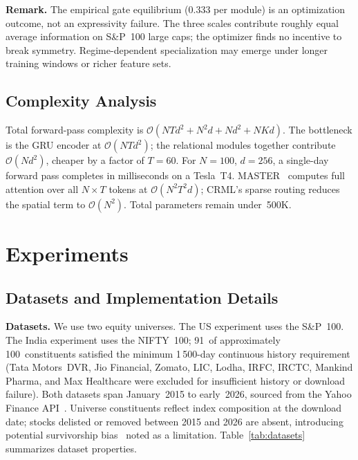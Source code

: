 \documentclass[journal]{IEEEtran}
\begin{document}
\smallskip
\noindent\textbf{Remark.} The empirical gate equilibrium (0.333 per
module) is an optimization outcome, not an expressivity failure. The
three scales contribute roughly equal average information on S\&P~100
large caps; the optimizer finds no incentive to break symmetry.
Regime-dependent specialization may emerge under longer training windows
or richer feature sets.

\subsection{Complexity Analysis}

Total forward-pass complexity is $\mathcal{O}(NTd^2+N^2d+Nd^2+NKd)$.
The bottleneck is the GRU encoder at $\mathcal{O}(NTd^2)$; the
relational modules together contribute $\mathcal{O}(Nd^2)$, cheaper by
a factor of $T=60$. For $N=100$, $d=256$, a single-day forward pass
completes in milliseconds on a Tesla~T4.
MASTER~\cite{li2024master} computes full attention over all
$N\!\times\!T$ tokens at $\mathcal{O}(N^2T^2d)$; CRML's sparse routing
reduces the spatial term to $\mathcal{O}(N^2)$. Total parameters remain
under~500K.



\section{Experiments}

\subsection{Datasets and Implementation Details}

\textbf{Datasets.} We use two equity universes. The US experiment uses
the S\&P~100. The India experiment uses the NIFTY~100; 91~of
approximately 100~constituents satisfied the minimum 1\,500-day
continuous history requirement (Tata Motors~DVR, Jio Financial, Zomato,
LIC, Lodha, IRFC, IRCTC, Mankind Pharma, and Max Healthcare were
excluded for insufficient history or download failure). Both datasets
span January~2015 to early~2026, sourced from the Yahoo Finance
API~\cite{yang2020qlib}. Universe constituents reflect index composition
at the download date; stocks delisted or removed between 2015 and 2026
are absent, introducing potential survivorship
bias~\cite{brown1992survivorship} noted as a limitation.
Table~\ref{tab:datasets} summarizes dataset properties.
\end{document}
